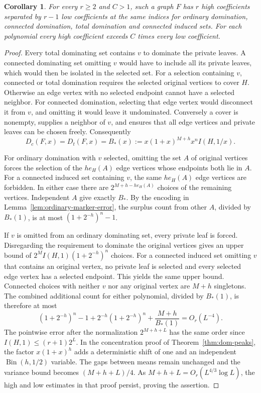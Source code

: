 \documentclass[11pt,a4paper]{article}
\newtheorem{corollary}[theorem]{Corollary}
\begin{document}
\begin{corollary}
For every $r\ge2$ and $C>1$, such a graph $F$ has $r$ high
coefficients separated by $r-1$ low coefficients at the same indices
for ordinary domination, connected domination, total domination and
connected induced sets. For each polynomial every high coefficient
exceeds $C$ times every low coefficient.
\end{corollary}
\begin{proof}
Every total dominating set contains $v$ to dominate the private
leaves. A connected dominating set omitting $v$ would have to include
all its private leaves, which would then be isolated in the selected set.
For a selection containing $v$, connected or total domination requires
the selected original vertices to cover $H$. Otherwise an edge
vertex with no selected endpoint cannot have a selected neighbor.
For connected domination, selecting that edge vertex would disconnect
it from $v$, and omitting it would leave it undominated. Conversely a
cover is nonempty, supplies a neighbor of $v$, and ensures that all
edge vertices and private leaves can be chosen freely. Consequently
\[
 D_c(F,x)=D_t(F,x)=B_*(x):=x(1+x)^{M+h}x^n I(H,1/x).
\]

For ordinary domination with $v$ selected, omitting the set $A$ of
original vertices forces the selection of the $he_H(A)$ edge vertices
whose endpoints both lie in $A$. For a connected induced set containing
$v$, the same $he_H(A)$ edge vertices are forbidden.
In either case there are $2^{M+h-he_H(A)}$ choices of the remaining
vertices. Independent $A$ give exactly $B_*$. By the encoding in
Lemma~\ref{lem:ordinary-marker-error}, the surplus count from other
$A$, divided by $B_*(1)$, is at most $(1+2^{-h})^n-1$.

If $v$ is omitted from an ordinary dominating set, every private leaf
is forced. Disregarding the requirement to dominate the original
vertices gives an upper bound of
$2^M I(H,1)(1+2^{-h})^n$ choices. For a connected induced set omitting
$v$ that contains an original vertex, no private leaf is selected and
every selected edge vertex has a selected endpoint. This yields the
same upper bound. Connected choices with neither $v$ nor any original
vertex are $M+h$ singletons. The combined additional count for either
polynomial, divided by $B_*(1)$, is therefore at most
\[
 (1+2^{-h})^n-1+2^{-h}(1+2^{-h})^n+\frac{M+h}{B_*(1)}=O_r(L^{-4}).
\]
The pointwise error after the normalization $2^{M+h+L}$ has the same
order since $I(H,1)\le(r+1)2^L$. In the concentration proof of
Theorem~\ref{thm:dom-peaks}, the factor $x(1+x)^h$ adds a deterministic
shift of one and an independent $\operatorname{Bin}(h,1/2)$ variable.
The gaps between means remain unchanged and the variance bound becomes
$(M+h+L)/4$. As $M+h+L=O_r(L^{4/3}\log L)$, the high and low estimates
in that proof persist, proving the assertion.
\end{proof}
\end{document}
